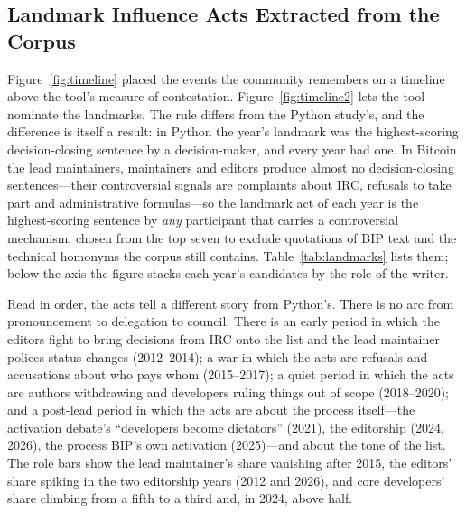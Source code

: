 \documentclass[sigconf,screen]{acmart}
\begin{document}
\subsection{Landmark Influence Acts Extracted from the Corpus}
\label{sec:landmarks}

Figure~\ref{fig:timeline} placed the events the community remembers on a timeline above the tool's measure of contestation. Figure~\ref{fig:timeline2} lets the tool nominate the landmarks. The rule differs from the Python study's, and the difference is itself a result: in Python the year's landmark was the highest-scoring decision-closing sentence by a decision-maker, and every year had one. In Bitcoin the lead maintainers, maintainers and editors produce almost no decision-closing sentences---their controversial signals are complaints about IRC, refusals to take part and administrative formulas---so the landmark act of each year is the highest-scoring sentence by \emph{any} participant that carries a controversial mechanism, chosen from the top seven to exclude quotations of BIP text and the technical homonyms the corpus still contains. Table~\ref{tab:landmarks} lists them; below the axis the figure stacks each year's candidates by the role of the writer.

Read in order, the acts tell a different story from Python's. There is no arc from pronouncement to delegation to council. There is an early period in which the editors fight to bring decisions from IRC onto the list and the lead maintainer polices status changes (2012--2014); a war in which the acts are refusals and accusations about who pays whom (2015--2017); a quiet period in which the acts are authors withdrawing and developers ruling things out of scope (2018--2020); and a post-lead period in which the acts are about the process itself---the activation debate's ``developers become dictators'' (2021), the editorship (2024, 2026), the process BIP's own activation (2025)---and about the tone of the list. The role bars show the lead maintainer's share vanishing after 2015, the editors' share spiking in the two editorship years (2012 and 2026), and core developers' share climbing from a fifth to a third and, in 2024, above half.
\end{document}
